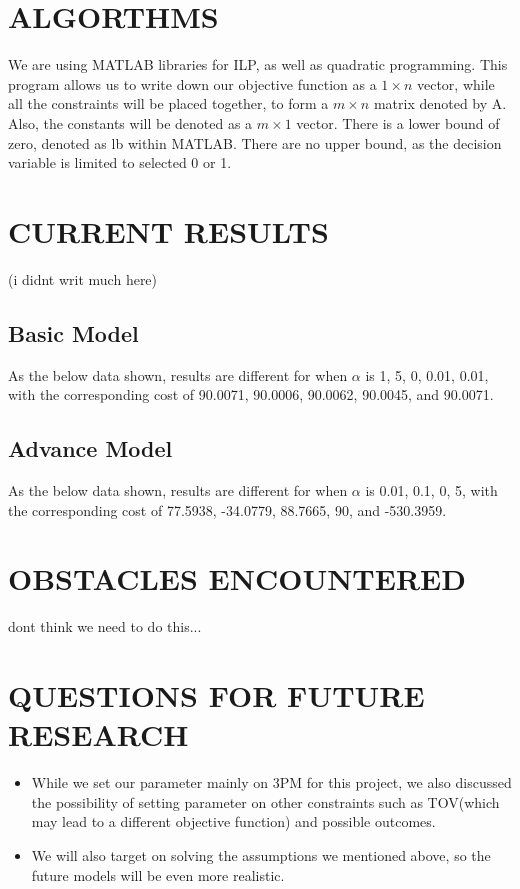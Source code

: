 \documentclass{article}
\begin{document}
\section{\centering ALGORTHMS}
We are using MATLAB libraries for ILP, as well as quadratic programming. 
This program allows us to write down our objective function as a $1 \times 
n$ vector, while all the constraints will be placed together, to form a $m 
\times n$ matrix denoted by A. Also, the constants will be denoted as a $m 
\times 1$ vector. There is a lower bound of zero, denoted as lb within 
MATLAB. There are no upper bound, as the decision variable is limited to 
selected 0 or 1.

\section{\centering CURRENT RESULTS} (i didnt writ much here)
\subsection{Basic Model}
As the below data shown, results are different for when $\alpha$ is 1, 5, 0, 0.01, 0.01, with the corresponding cost of 90.0071, 90.0006, 90.0062, 90.0045, and 90.0071. 
\subsection{Advance Model }
As the below data shown, results are different for when $\alpha$ is 0.01, 0.1, 0, 5, with the corresponding cost of 77.5938, -34.0779, 88.7665, 90, and -530.3959. 


\section{\centering OBSTACLES ENCOUNTERED }
dont think we need to do this...


\section{\centering QUESTIONS FOR FUTURE RESEARCH }
\begin{itemize}
\item While we set our parameter mainly on 3PM for this project, we also discussed the possibility of setting parameter on other constraints such as TOV(which may lead to a different objective function) and possible outcomes. 
\item We will also target on solving the assumptions we mentioned above, so the future models will be even more realistic.

\end{itemize}
\end{document}
